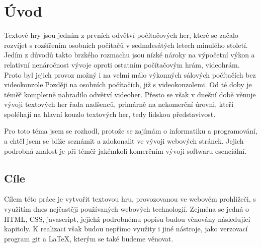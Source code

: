 \documentclass[main.tex]{subfiles}
\begin{document}
\section{Úvod}
Textové hry jsou jedním z prvních odvětví počítačových her, které se začalo rozvíjet s rozšířením osobních počítačů v sedmdesátých letech minulého století. Jedím z důvodů takto brzkého rozmachu jsou nízké nároky na výpočetní výkon a relativní nenáročnost vývoje oproti ostatním počítačovým hrám, videohrám. Proto byl jejich provoz možný i na velmi málo výkonných sálových počítačích bez videokonzole.Později na osobních počítačích, již s videokonzolemi. \cite{web:pcmag:en:oldcomputergames}
 Od té doby je téměř kompletně nahradilo odvětví videoher. Přesto se však v dnešní době věnuje vývoji textových her řada nadšenců, primárně na nekomerční úrovni, kteří spoléhají na hlavní kouzlo textových her, tedy lidskou představivost. \cite{web:wik:en:textgame}

Pro toto téma jsem se rozhodl, protože se zajímám o informatiku a programování, a chtěl jsem se blíže seznámit a zdokonalit ve vývoji webových stránek. Jejich podrobná znalost je při téměř jakémkoli komerčním vývoji softwaru esenciální.

\subsection{Cíle}
Cílem této práce je vytvořit textovou hru, provozovanou ve webovém prohlížeči, s využitím dnes nejčastěji používaných webových technologií. Zejména se jedná o HTML, CSS, javascript, jejichž podrobnému popisu budou věnovány následující kapitoly. K realizaci však budou nepřímo využity i jiné nástroje, jako verzovací program git a \LaTeX, kterým se také budeme věnovat.
\end{document}
